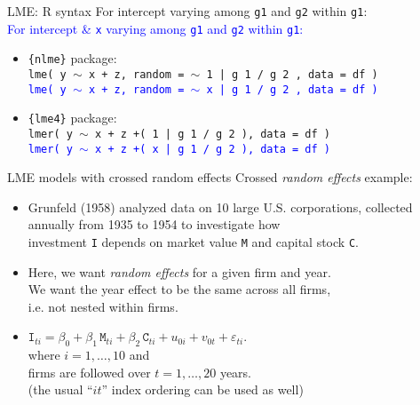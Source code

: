 \documentclass{beamer}
\begin{document}
\begin{frame}{LME: R syntax}
\small 
For intercept varying among \texttt{g1} and \texttt{g2} within \texttt{g1}: \\
\textcolor{blue}{For intercept \& \texttt{x} varying among \texttt{g1} and \texttt{g2} within \texttt{g1}:}
\bigskip
\begin{itemize}
    \item \texttt{\{nlme\}} package: \\ \medskip
    \texttt{lme( y $\sim$ x + z, random = $\sim$ 1 |  g 1 / g 2 , data = df )}\\
    \textcolor{blue}{\texttt{lme( y $\sim$ x + z, random = $\sim$ x |  g 1 / g 2 , data = df )}}
    \bigskip
    \item \texttt{\{lme4\}} package: \\ \medskip
    \texttt{lmer( y $\sim$ x + z +( 1 | g 1 / g 2 ), data = df )}\\
    \textcolor{blue}{\texttt{lmer( y $\sim$ x + z +( x | g 1 / g 2 ), data = df )}}
\end{itemize}
\end{frame}
\begin{frame}{LME models with crossed random effects}
Crossed \textit{random effects} example:\\
\medskip
\begin{itemize}
\item Grunfeld (1958) analyzed data on 10 large U.S. corporations,
collected annually from 1935 to 1954 to investigate how \\investment \texttt{I} depends on market value \texttt{M} and capital stock \texttt{C}.\\
\medskip
\item Here, we want \textit{random effects} for a given firm and year.\\
\smallskip
We want the year effect to be the same across all firms, \\i.e. not nested within firms.
\bigskip
\item $\texttt{I}_{ti} = \beta_0 + \beta_1 \, \texttt{M}_{ti} 
+ \beta_2 \, \texttt{C}_{ti} + u_{0i} + v_{0t} + \varepsilon_{ti}.$\\
\medskip
where $i=1, \dots, 10$ and \\firms are followed over $t=1,\dots,20$ years.
\\(the usual ``$it$'' index ordering can be used as well)
\end{itemize}
\end{frame}
\end{document}
